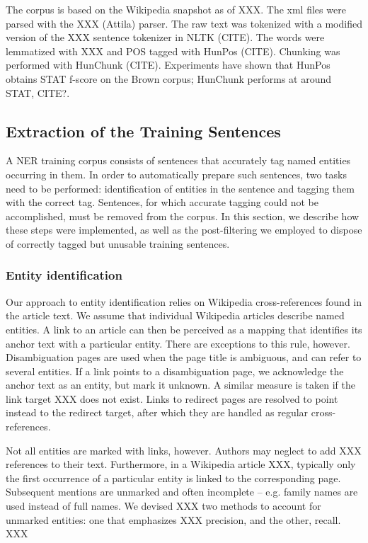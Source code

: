 \documentclass[11pt]{article}
\begin{document}
The corpus is based on the Wikipedia snapshot as of XXX. The xml files were parsed with the XXX (Attila) parser. The raw text was tokenized with a modified version of the XXX sentence tokenizer in NLTK (CITE). The words were lemmatized with XXX and POS tagged with HunPos (CITE). Chunking was performed with HunChunk (CITE). Experiments have shown that HunPos obtains STAT f-score on the Brown corpus; HunChunk performs at around STAT, CITE?.

\subsection{Extraction of the Training Sentences}

A NER training corpus consists of sentences that accurately tag named entities occurring in them. In order to automatically prepare such sentences, two tasks need to be performed: identification of entities in the sentence and tagging them with the correct tag. Sentences, for which accurate tagging could not be accomplished, must be removed from the corpus. In this section, we describe how these steps were implemented, as well as the post-filtering we employed to dispose of correctly tagged but unusable training sentences.

\subsubsection{Entity identification}

Our approach to entity identification relies on Wikipedia cross-references found in the article text. We assume that individual Wikipedia articles describe named entities. A link to an article can then be perceived as a mapping that identifies its anchor text with a particular entity. There are exceptions to this rule, however. Disambiguation pages are used when the page title is ambiguous, and can refer to several entities. If a link points to a disambiguation page, we acknowledge the anchor text as an entity, but mark it unknown. A similar measure is taken if the link target XXX does not exist. Links to redirect pages are resolved to point instead to the redirect target, after which they are handled as regular cross-references.

Not all entities are marked with links, however. Authors may neglect to add XXX references to their text. Furthermore, in a Wikipedia article XXX, typically only the first occurrence of a particular entity is linked to the corresponding page. Subsequent mentions are unmarked and often incomplete -- e.g. family names are used instead of full names. We devised XXX two methods to account for unmarked entities: one that emphasizes XXX precision, and the other, recall. XXX
\end{document}
